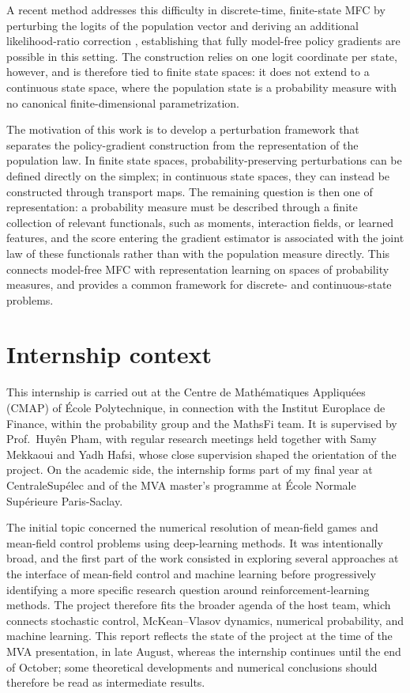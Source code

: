 A recent method addresses this difficulty in discrete-time, finite-state MFC by perturbing the logits of the population vector and deriving an additional likelihood-ratio correction \cite{meunier2026model}, establishing that fully model-free policy gradients are possible in this setting. The construction relies on one logit coordinate per state, however, and is therefore tied to finite state spaces: it does not extend to a continuous state space, where the population state is a probability measure with no canonical finite-dimensional parametrization.

The motivation of this work is to develop a perturbation framework that separates the policy-gradient construction from the representation of the population law. In finite state spaces, probability-preserving perturbations can be defined directly on the simplex; in continuous state spaces, they can instead be constructed through transport maps. The remaining question is then one of representation: a probability measure must be described through a finite collection of relevant functionals, such as moments, interaction fields, or learned features, and the score entering the gradient estimator is associated with the joint law of these functionals rather than with the population measure directly. This connects model-free MFC with representation learning on spaces of probability measures, and provides a common framework for discrete- and continuous-state problems.


\section{Internship context}

This internship is carried out at the Centre de Mathématiques Appliquées (CMAP) of \'Ecole Polytechnique, in connection with the Institut Europlace de Finance, within the probability group and the MathsFi team. It is supervised by Prof.~Huyên Pham, with regular research meetings held together with Samy Mekkaoui and Yadh Hafsi, whose close supervision shaped the orientation of the project. On the academic side, the internship forms part of my final year at CentraleSupélec and of the MVA master's programme at \'Ecole Normale Supérieure Paris-Saclay.

The initial topic concerned the numerical resolution of mean-field games and mean-field control problems using deep-learning methods. It was intentionally broad, and the first part of the work consisted in exploring several approaches at the interface of mean-field control and machine learning before progressively identifying a more specific research question around reinforcement-learning methods. The project therefore fits the broader agenda of the host team, which connects stochastic control, McKean--Vlasov dynamics, numerical probability, and machine learning. This report reflects the state of the project at the time of the MVA presentation, in late August, whereas the internship continues until the end of October; some theoretical developments and numerical conclusions should therefore be read as intermediate results.

